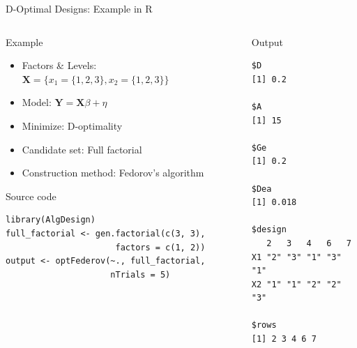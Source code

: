 \documentclass[10pt, compress, aspectratio=169, xcolor={table,usenames,dvipsnames}]{beamer}
\begin{document}
\begin{frame}[fragile,label={sec:orgbce45b4}]{D-Optimal Designs: Example in R}
 \begin{columns}
\begin{column}{0.5\columnwidth}
\begin{block}{Example}
\begin{itemize}
\item Factors \& Levels: \(\mathbf{X} = \{x_1 = \{1, 2, 3\}, x_2 = \{1, 2, 3\}\}\)
\item Model: \(\mathbf{Y} = \mathbf{X}\beta + \eta\)
\item Minimize: \alert{D-optimality}
\item Candidate set: \alert{Full factorial}
\item Construction method: \alert{Fedorov's algorithm}
\end{itemize}

\begin{block}{Source code}
\lstset{language=r,label= ,caption= ,captionpos=b,numbers=none}
\begin{lstlisting}
library(AlgDesign)
full_factorial <- gen.factorial(c(3, 3),
                      factors = c(1, 2))
output <- optFederov(~., full_factorial,
                     nTrials = 5)
\end{lstlisting}
\end{block}
\end{block}
\end{column}

\begin{column}{0.5\columnwidth}
\begin{block}{Output}
\scriptsize

\begin{verbatim}
$D
[1] 0.2

$A
[1] 15

$Ge
[1] 0.2

$Dea
[1] 0.018

$design
   2   3   4   6   7
X1 "2" "3" "1" "3" "1"
X2 "1" "1" "2" "2" "3"

$rows
[1] 2 3 4 6 7
\end{verbatim}

\normalsize
\end{block}
\end{column}
\end{columns}
\end{frame}
\end{document}
